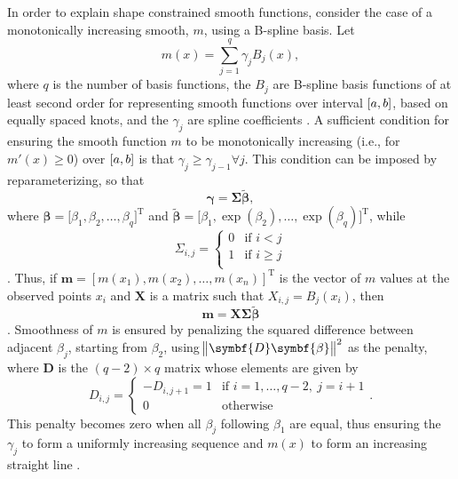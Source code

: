 In order to explain shape constrained smooth functions, consider the case of a monotonically increasing smooth, \(m\), using a B-spline basis.  Let
\begin{equation}
  \label{eq:SCAMMonotonicallyIncreasingSmooth}
  m(x) = \sum_{j = 1}^q \gamma_j B_j(x),
\end{equation}
where \(q\) is the number of basis functions, the \(B_j\) are B-spline basis functions of at least second order for representing smooth functions over interval \(\interval{a}{b}\), based on equally spaced knots, and the \(\gamma_j\) are spline coefficients \parencite{Pya2015}.  A sufficient condition for ensuring the smooth function \(m\) to be monotonically increasing (i.e., for \(m'(x) \geq 0\)) over \(\interval{a}{b}\) is that \(\gamma_j \geq \gamma_{j - 1} \forall j\).  This condition can be imposed by reparameterizing, so that
\begin{equation}
  \label{eq:SCAMReparameterizedGamma}
  \symbf{\gamma} = \symbf{\Sigma} \tilde{\symbf{\beta}},
\end{equation}
where \(\symbf{\beta} = \bigl[\beta_1, \beta_2, \ldots, \beta_q\bigr]^{\text{T}}\) and \(\tilde{\symbf{\beta}} = \bigl[\beta_1, \exp(\beta_2), \ldots, \exp(\beta_q)\bigr]^{\text{T}}\), while
\begin{equation}
  \label{eq:SCAMSigmaMontoneIncreasing}
  \Sigma_{i, j} =
  \begin{cases}
    0 &\text{if } i < j \\
    1 &\text{if } i \geq j \\
  \end{cases}
\end{equation}
\parencite{Pya2015}.
Thus, if \(\symbf{m} = [m(x_1), m(x_2), \ldots, m(x_n)]^{\text{T}}\) is the vector of \(m\) values at the observed points \(x_i\) and \(\symbf{X}\) is a matrix such that \(X_{i, j} = B_j(x_i)\), then
\begin{equation}
  \label{eq:SCAMConstrainedSmootherVector}
  \symbf{m} = \symbf{X} \symbf{\Sigma} \tilde{\symbf{\beta}}
\end{equation}
\parencite{Pya2015}.
Smoothness of \(m\) is ensured by penalizing the squared difference between adjacent \(\beta_j\), starting from \(\beta_2\), using \(\norm{\symbf{D} \symbf{\beta}}^2\) as the penalty, where \(\symbf{D}\) is the \((q-2) \times q\) matrix
whose elements are given by
\begin{equation}
  \label{eq:SCAMDMonotoneIncreasing}
  D_{i, j} = 
  \begin{cases}
    - D_{i, j + 1} = 1 &\text{if } i = 1, \ldots, q - 2,~ j = i + 1 \\
    0 &\text{otherwise}
  \end{cases}.
\end{equation}
This penalty becomes zero when all \(\beta_j\) following \(\beta_1\) are equal, thus ensuring the \(\gamma_j\) to form a uniformly increasing sequence and \(m(x)\) to form an increasing straight line \parencite{Pya2015}.


